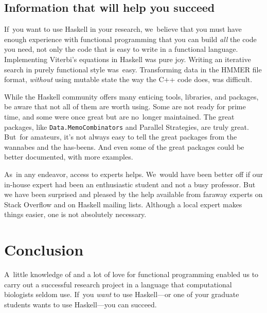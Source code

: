 \documentclass[preprint,nonatbib,blockstyle,times]{sigplanconf}
\newcommand\seclabel[1]{\label{sec:#1}}
\begin{document}
\subsection{Information that will help you succeed}

If~you want to use Haskell in your research, we~believe that you must
have enough experience with functional programming that you can build
\emph{all} the code you need, not only the code that is easy to write
in a functional language.
Implementing Viterbi's equations in Haskell was pure joy.
Writing an iterative search in purely functional style was~easy.
Transforming data in the HMMER file format, \emph{without}
using mutable state the way the C++ code does, was difficult.

\seclabel{penumbra}

While the Haskell community offers many
enticing tools, libraries, and packages,
be aware that
not all of them are worth using.
Some are not ready for prime time, and some were once great but are
no~longer maintained.
The great packages, like \texttt{Data.MemoCombinators} and Parallel
Strategies, are truly great.
But~for amateurs, it's not always easy to tell the great packages from the wannabes
and the has-beens.
And even some of the great packages could be better documented, with
more examples.



As~in any endeavor, access to experts helps.
We~would have been better off if our in-house expert had been an
enthusiastic student and not a busy professor.
But we have been surprised and pleased by the help available from
faraway experts on Stack Overflow and on Haskell mailing lists.
Although a local expert makes things easier, one is not
 absolutely necessary.

\section{Conclusion}

A~little knowledge of and a lot of love for functional programming
enabled us to carry out a successful research project in a language
that computational biologists seldom use.
If~you \emph{want} to use Haskell---or one of your graduate students
wants to use Haskell---you can
succeed. 
\end{document}
